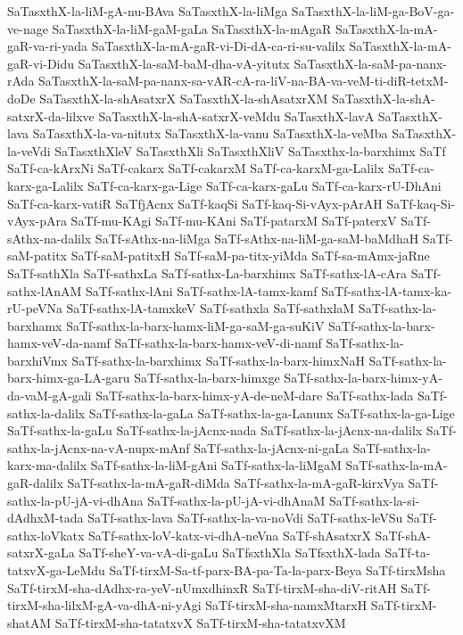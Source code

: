 {SaTasxthX-la-liM-gA-nu-BAva
SaTasxthX-la-liMga
SaTasxthX-la-liM-ga-BoV-ga-ve-nage
SaTasxthX-la-liM-gaM-gaLa
SaTasxthX-la-mAgaR
SaTasxthX-la-mA-gaR-va-ri-yada
SaTasxthX-la-mA-gaR-vi-Di-dA-ca-ri-su-valilx
SaTasxthX-la-mA-gaR-vi-Didu
SaTasxthX-la-saM-baM-dha-vA-yitutx
SaTasxthX-la-saM-pa-nanx-rAda
SaTasxthX-la-saM-pa-nanx-sa-vAR-cA-ra-liV-na-BA-va-veM-ti-diR-tetxM-doDe
SaTasxthX-la-shAsatxrX
SaTasxthX-la-shAsatxrXM
SaTasxthX-la-shA-satxrX-da-lilxve
SaTasxthX-la-shA-satxrX-veMdu
SaTasxthX-lavA
SaTasxthX-lava
SaTasxthX-la-va-nitutx
SaTasxthX-la-vanu
SaTasxthX-la-veMba
SaTasxthX-la-veVdi
SaTasxthXleV
SaTasxthXli
SaTasxthXliV
SaTasxthx-la-barxhimx
SaTf
SaTf-ca-kArxNi
SaTf-cakarx
SaTf-cakarxM
SaTf-ca-karxM-ga-Lalilx
SaTf-ca-karx-ga-Lalilx
SaTf-ca-karx-ga-Lige
SaTf-ca-karx-gaLu
SaTf-ca-karx-rU-DhAni
SaTf-ca-karx-vatiR
SaTfjAcnx
SaTf-kaqSi
SaTf-kaq-Si-vAyx-pArAH
SaTf-kaq-Si-vAyx-pAra
SaTf-mu-KAgi
SaTf-mu-KAni
SaTf-patarxM
SaTf-paterxV
SaTf-sAthx-na-dalilx
SaTf-sAthx-na-liMga
SaTf-sAthx-na-liM-ga-saM-baMdhaH
SaTf-saM-patitx
SaTf-saM-patitxH
SaTf-saM-pa-titx-yiMda
SaTf-sa-mAmx-jaRne
SaTf-sathXla
SaTf-sathxLa
SaTf-sathx-La-barxhimx
SaTf-sathx-lA-cAra
SaTf-sathx-lAnAM
SaTf-sathx-lAni
SaTf-sathx-lA-tamx-kamf
SaTf-sathx-lA-tamx-ka-rU-peVNa
SaTf-sathx-lA-tamxkeV
SaTf-sathxla
SaTf-sathxlaM
SaTf-sathx-la-barxhamx
SaTf-sathx-la-barx-hamx-liM-ga-saM-ga-suKiV
SaTf-sathx-la-barx-hamx-veV-da-namf
SaTf-sathx-la-barx-hamx-veV-di-namf
SaTf-sathx-la-barxhiVmx
SaTf-sathx-la-barxhimx
SaTf-sathx-la-barx-himxNaH
SaTf-sathx-la-barx-himx-ga-LA-garu
SaTf-sathx-la-barx-himxge
SaTf-sathx-la-barx-himx-yA-da-vaM-gA-gali
SaTf-sathx-la-barx-himx-yA-de-neM-dare
SaTf-sathx-lada
SaTf-sathx-la-dalilx
SaTf-sathx-la-gaLa
SaTf-sathx-la-ga-Lanunx
SaTf-sathx-la-ga-Lige
SaTf-sathx-la-gaLu
SaTf-sathx-la-jAcnx-nada
SaTf-sathx-la-jAcnx-na-dalilx
SaTf-sathx-la-jAcnx-na-vA-nupx-mAnf
SaTf-sathx-la-jAcnx-ni-gaLa
SaTf-sathx-la-karx-ma-dalilx
SaTf-sathx-la-liM-gAni
SaTf-sathx-la-liMgaM
SaTf-sathx-la-mA-gaR-dalilx
SaTf-sathx-la-mA-gaR-diMda
SaTf-sathx-la-mA-gaR-kirxVya
SaTf-sathx-la-pU-jA-vi-dhAna
SaTf-sathx-la-pU-jA-vi-dhAnaM
SaTf-sathx-la-si-dAdhxM-tada
SaTf-sathx-lava
SaTf-sathx-la-va-noVdi
SaTf-sathx-leVSu
SaTf-sathx-loVkatx
SaTf-sathx-loV-katx-vi-dhA-neVna
SaTf-shAsatxrX
SaTf-shA-satxrX-gaLa
SaTf-sheY-va-vA-di-gaLu
SaTfsxthXla
SaTfsxthX-lada
SaTf-ta-tatxvX-ga-LeMdu
SaTf-tirxM-Sa-tf-parx-BA-pa-Ta-la-parx-Beya
SaTf-tirxMsha
SaTf-tirxM-sha-dAdhx-ra-yeV-nUmxdhinxR
SaTf-tirxM-sha-diV-ritAH
SaTf-tirxM-sha-lilxM-gA-va-dhA-ni-yAgi
SaTf-tirxM-sha-namxMtarxH
SaTf-tirxM-shatAM
SaTf-tirxM-sha-tatatxvX
SaTf-tirxM-sha-tatatxvXM
}
